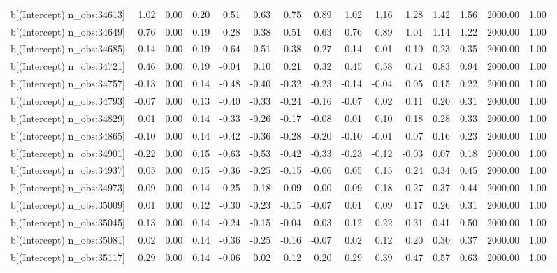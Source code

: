 \begin{table}[ht]
\begin{tabular}{rrrrrrrrrrrrrrr}
  b[(Intercept) n\_obs:34613] & 1.02 & 0.00 & 0.20 & 0.51 & 0.63 & 0.75 & 0.89 & 1.02 & 1.16 & 1.28 & 1.42 & 1.56 & 2000.00 & 1.00 \\ 
  b[(Intercept) n\_obs:34649] & 0.76 & 0.00 & 0.19 & 0.28 & 0.38 & 0.51 & 0.63 & 0.76 & 0.89 & 1.01 & 1.14 & 1.22 & 2000.00 & 1.00 \\ 
  b[(Intercept) n\_obs:34685] & -0.14 & 0.00 & 0.19 & -0.64 & -0.51 & -0.38 & -0.27 & -0.14 & -0.01 & 0.10 & 0.23 & 0.35 & 2000.00 & 1.00 \\ 
  b[(Intercept) n\_obs:34721] & 0.46 & 0.00 & 0.19 & -0.04 & 0.10 & 0.21 & 0.32 & 0.45 & 0.58 & 0.71 & 0.83 & 0.94 & 2000.00 & 1.00 \\ 
  b[(Intercept) n\_obs:34757] & -0.13 & 0.00 & 0.14 & -0.48 & -0.40 & -0.32 & -0.23 & -0.14 & -0.04 & 0.05 & 0.15 & 0.22 & 2000.00 & 1.00 \\ 
  b[(Intercept) n\_obs:34793] & -0.07 & 0.00 & 0.13 & -0.40 & -0.33 & -0.24 & -0.16 & -0.07 & 0.02 & 0.11 & 0.20 & 0.31 & 2000.00 & 1.00 \\ 
  b[(Intercept) n\_obs:34829] & 0.01 & 0.00 & 0.14 & -0.33 & -0.26 & -0.17 & -0.08 & 0.01 & 0.10 & 0.18 & 0.28 & 0.33 & 2000.00 & 1.00 \\ 
  b[(Intercept) n\_obs:34865] & -0.10 & 0.00 & 0.14 & -0.42 & -0.36 & -0.28 & -0.20 & -0.10 & -0.01 & 0.07 & 0.16 & 0.23 & 2000.00 & 1.00 \\ 
  b[(Intercept) n\_obs:34901] & -0.22 & 0.00 & 0.15 & -0.63 & -0.53 & -0.42 & -0.33 & -0.23 & -0.12 & -0.03 & 0.07 & 0.18 & 2000.00 & 1.00 \\ 
  b[(Intercept) n\_obs:34937] & 0.05 & 0.00 & 0.15 & -0.36 & -0.25 & -0.15 & -0.06 & 0.05 & 0.15 & 0.24 & 0.34 & 0.45 & 2000.00 & 1.00 \\ 
  b[(Intercept) n\_obs:34973] & 0.09 & 0.00 & 0.14 & -0.25 & -0.18 & -0.09 & -0.00 & 0.09 & 0.18 & 0.27 & 0.37 & 0.44 & 2000.00 & 1.00 \\ 
  b[(Intercept) n\_obs:35009] & 0.01 & 0.00 & 0.12 & -0.30 & -0.23 & -0.15 & -0.07 & 0.01 & 0.09 & 0.17 & 0.26 & 0.31 & 2000.00 & 1.00 \\ 
  b[(Intercept) n\_obs:35045] & 0.13 & 0.00 & 0.14 & -0.24 & -0.15 & -0.04 & 0.03 & 0.12 & 0.22 & 0.31 & 0.41 & 0.50 & 2000.00 & 1.00 \\ 
  b[(Intercept) n\_obs:35081] & 0.02 & 0.00 & 0.14 & -0.36 & -0.25 & -0.16 & -0.07 & 0.02 & 0.12 & 0.20 & 0.30 & 0.37 & 2000.00 & 1.00 \\ 
  b[(Intercept) n\_obs:35117] & 0.29 & 0.00 & 0.14 & -0.06 & 0.02 & 0.12 & 0.20 & 0.29 & 0.39 & 0.47 & 0.57 & 0.63 & 2000.00 & 1.00 \\ 

\end{tabular}
\end{table}
